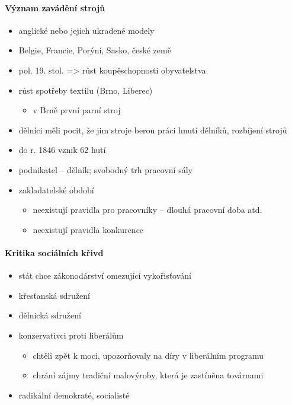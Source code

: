 \paragraph{Význam zavádění strojů}
\begin{itemize}
\item anglické nebo jejich ukradené modely 
\item Belgie, Francie, Porýní, Sasko, české země
\item pol. 19. stol. => růst koupěschopnosti obyvatelstva
\item růst spotřeby textilu (Brno, Liberec)
	\begin{itemize}
	\item v Brně první parní stroj
	\end{itemize}
\item dělníci měli pocit, že jim stroje berou práci \ra hnutí dělníků, rozbíjení strojů
\item do r. 1846 vznik 62 hutí
\item podnikatel -- dělník; svobodný trh pracovní sály
\item zakladatelské období
	\begin{itemize}
	\item neexistují pravidla pro pracovníky -- dlouhá pracovní doba atd.
	\item neexistují pravidla konkurence
	\end{itemize}
\end{itemize}

\paragraph{Kritika sociálních křivd}
\begin{itemize}
\item stát chce zákonodárství omezující vykořisťování
\item křesťanská sdružení
\item dělnická sdružení
\item konzervativci proti liberálům
	\begin{itemize}
	\item chtěli zpět k moci, upozorňovaly na díry v liberálním programu
	\item chrání zájmy tradiční malovýroby, která je zastíněna továrnami
	\end{itemize}
\item radikální demokraté, socialisté
\end{itemize}

